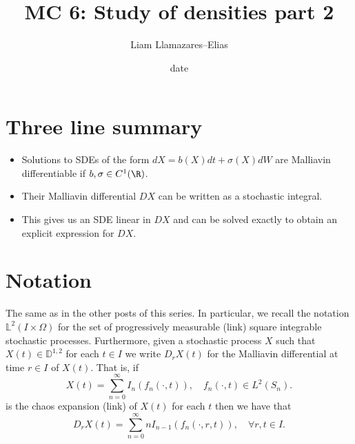 \documentclass[
    a4paper,
    DIV=14,
    abstract=true,
    numbers=noenddot
]{scrartcl}
\begin{document}
\title{MC 6: Study of densities part 2}
\author{Liam Llamazares--Elias}
\date{date}
\maketitle
\section{ Three line summary}
\begin{itemize}
	\item Solutions to SDEs of the form $dX=b(X) d t +\sigma (X)dW $ are Malliavin differentiable if $b,\sigma \in C^1(\R)$.
	\item Their Malliavin differential $DX$ can be written as a stochastic integral.
	\item This gives us an SDE linear in $DX$ and can be solved exactly to obtain an explicit expression for  $DX$.
\end{itemize}
\section{Notation}
The same as in the other posts of this series. In particular, we recall the notation $\mathbb{L}^2(I\times\Omega)$ for the set of progressively measurable (link) square integrable stochastic processes. Furthermore, given a stochastic process $X$ such that  $X(t)\in \mathbb{D}^{1,2}$ for each $t\in I$ we write $D_rX(t)$ for the Malliavin differential at  time $r\in I$ of $X(t)$. That is, if
\begin{equation}\label{ce}
	X(t)=\sum_{n=0}^{\infty}  I_n(f_n(\cdot ,t)),\quad f_n(\cdot ,t)\in L^2(S_n).
\end{equation}
is the chaos expansion (link) of $X(t)$ for each  $t$ then we have that
\begin{equation}\label{ced}
	D_rX(t)=\sum_{n=0}^{\infty}  nI_{n-1}(f_n(\cdot ,r,t)) , \quad\forall r,t\in I.
\end{equation}
\end{document}
